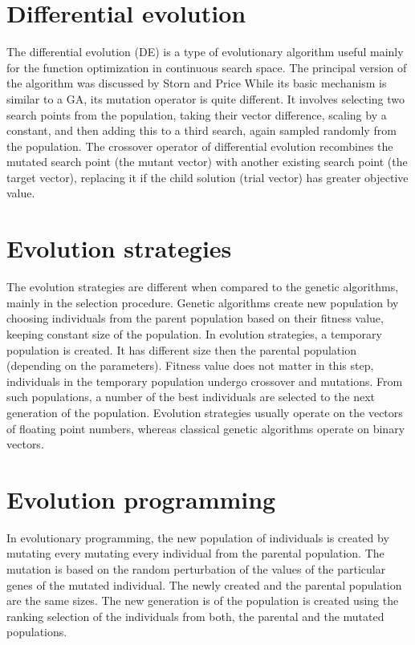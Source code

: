 \documentclass[oneside]{ctuthesis}
\theoremstyle{plain}
\theoremstyle{definition}
\theoremstyle{note}
\begin{document}
\section{Differential evolution}
The differential evolution (DE) is a type of evolutionary algorithm useful mainly for the function optimization in continuous search space. The principal version of the algorithm was discussed by Storn and Price \cite{storn1997differential} While its basic mechanism is similar to a GA, its mutation operator is quite different. It involves selecting two search points from the population, taking their vector difference, scaling by a constant, and then adding this to a third search, again sampled randomly from the population. The crossover operator of differential evolution recombines the mutated search point (the mutant vector) with another existing search point (the target vector), replacing it if the child solution (trial vector) has greater objective value.

\section{Evolution strategies}
The evolution strategies are different when compared to the genetic algorithms, mainly in the selection procedure. Genetic algorithms create new population by choosing individuals from the parent population based on their fitness value, keeping constant size of the population. In evolution strategies, a temporary population is created. It has different size then the parental population (depending on the parameters). Fitness value does not matter in this step, individuals in the temporary population undergo crossover and mutations. From such populations, a number of the best individuals are selected to the next generation of the population. Evolution strategies usually operate on the vectors of floating point numbers, whereas classical genetic algorithms operate on binary vectors.

\section{Evolution programming}
In evolutionary programming, the new population of individuals is created by mutating every mutating every individual from the parental population. The mutation is based on the random perturbation of the values of the particular genes of the mutated individual. The newly created and the parental population are the same sizes. The new generation is of the population is created using the ranking selection of the individuals from both, the parental and the mutated populations.
\end{document}
